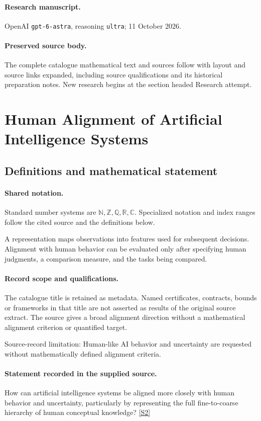 \documentclass[11pt]{article}
\begin{document}
\paragraph{Research manuscript.} OpenAI \texttt{gpt-6-astra}, reasoning \texttt{ultra}; 11 October 2026.
\paragraph{Preserved source body.} The complete catalogue mathematical text and sources follow with layout and source links expanded, including source qualifications and its historical preparation notes. New research begins at the section headed Research attempt.

\section{Human Alignment of Artificial Intelligence Systems}\label{statement}

\subsection{Definitions and mathematical statement}

\paragraph{Shared notation.}Standard number systems are $\mathbb N,\mathbb Z,\mathbb Q,\mathbb R,\mathbb C$. Specialized notation and index ranges follow the cited source and the definitions below.


A representation maps observations into features used for subsequent decisions. Alignment with human behavior can be evaluated only after specifying human judgments, a comparison measure, and the tasks being compared.
\paragraph{Record scope and qualifications.}
The catalogue title is retained as metadata. Named certificates, contracts, bounds or frameworks in that title are not asserted as results of the original source extract.
The source gives a broad alignment direction without a mathematical alignment criterion or quantified target.

Source-record limitation: Human-like AI behavior and uncertainty are requested without mathematically defined alignment criteria.
\paragraph{Statement recorded in the supplied source.}
How can artificial intelligence systems be aligned more closely with human behavior and uncertainty, particularly by representing the full fine-to-coarse hierarchy of human conceptual knowledge? \href{https://doi.org/10.4171/owr/2026/11}{[S2]}
\end{document}
